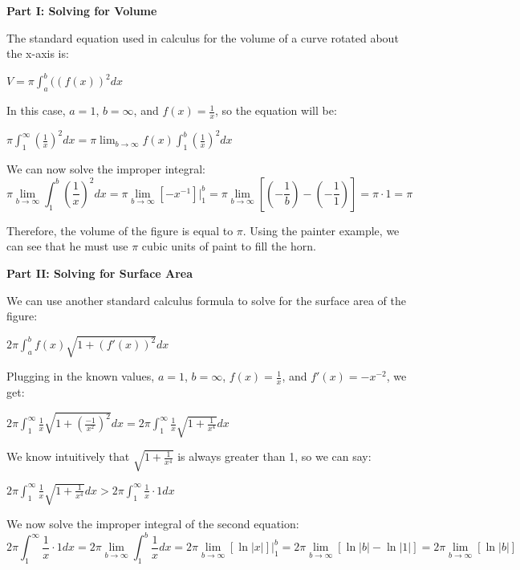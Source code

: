 \noindent
\textbf{Part I: Solving for Volume}

The standard equation used in calculus for the volume of a curve rotated about the x-axis is: 

\begin{center}
$V=\pi\int_a^b((f(x))^2dx$
\end{center}

In this case, $a=1$, $b=\infty$, and $f(x)=\frac{1}{x}$, so the equation will be: 

\begin{center}
$\pi\int_1^\infty(\frac{1}{x})^2dx=\pi\lim_{b \to \infty} f(x)\int_1^b(\frac{1}{x})^2dx$
\end{center}

We can now solve the improper integral:
\[\pi\lim_{b \to \infty}\int_1^b(\frac{1}{x})^2 dx
= \pi\lim_{b \to \infty}[-x^{-1}]\bigg|_1^b
= \pi\lim_{b \to \infty}[(-\frac{1}{b})-(-\frac{1}{1})]
= \pi \cdot 1
= \pi
\]

Therefore, the volume of the figure is equal to $\pi$. Using the painter example, we can see that he must use $\pi$ cubic units of paint to fill the horn.

	\noindent
	\textbf{Part II: Solving for Surface Area}
		
	We can use another standard calculus formula to solve for the surface area of the figure: 

\begin{center}
$2\pi\int_a^bf(x)\sqrt{1+(f'(x))^2}dx$
\end{center}

Plugging in the known values, $a=1$, $b=\infty$, $f(x)=\frac{1}{x}$, and $f'(x)= -x^{-2}$, we get: 

\begin{center}
$2\pi\int_1^\infty\frac{1}{x}\sqrt{1+(\frac{-1}{x^2})^2}dx=2\pi\int_1^\infty\frac{1}{x}\sqrt{1+\frac{1}{x^4}}dx$
\end{center}

We know intuitively that $\sqrt{1+\frac{1}{x^4}}$ is always greater than 1, so we can say:

\begin{center}
$2\pi\int_1^\infty\frac{1}{x}\sqrt{1+\frac{1}{x^4}}dx>2\pi\int_1^\infty\frac{1}{x}\cdot1dx$
\end{center}

We now solve the improper integral of the second equation:
\[
2\pi\int_1^\infty\frac{1}{x} \cdot 1dx
= 2\pi\lim_{b \to \infty}\int_1^b\frac{1}{x}dx
= 2\pi\lim_{b \to \infty}[\ln{|x|}]\bigg|_1^b
= 2\pi\lim_{b \to \infty}[\ln{|b|}-\ln{|1|}]
= 2\pi\lim_{b \to \infty}[\ln{|b|}]
\]

